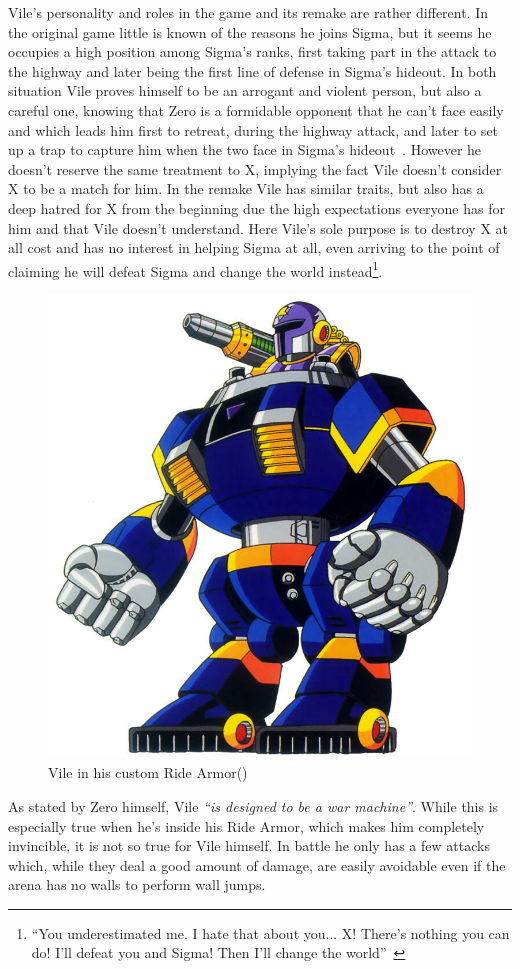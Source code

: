 Vile's personality and roles in the \x game and its remake are rather different. In the original game little is known of the reasons he joins Sigma, but it seems he occupies a high position among Sigma's ranks, first taking part in the attack to the highway and later being the first line of defense in Sigma's hideout. In both situation Vile proves himself to be an arrogant and violent person, but also a careful one, knowing that Zero is a formidable opponent that he can't face easily and which leads him first to retreat, during the highway attack, and later to set up a trap to capture him when the two face in Sigma's hideout~\cite{wiki:Vile}.  However he doesn't reserve the same treatment to X, implying the fact Vile doesn't consider X to be a match for him. In the remake Vile has similar traits, but also has a deep hatred for X from the beginning due the high expectations everyone has for him and that Vile doesn't understand. Here Vile's sole purpose is to destroy X at all cost and has no interest in helping Sigma at all, even arriving to the point of claiming he will defeat Sigma and change the world instead\footnote{\enquote{You underestimated me. I hate that about you... X! There's nothing you can do! I'll defeat you and Sigma! Then I'll change the world}~\cite{wiki:MMX_script}}.
\begin{figure}[htp]
	\centering
	\includegraphics[width=0.35\linewidth]{figures/X1/Sigma_stages/VileRideArmor.jpg}
	\caption{Vile in his custom Ride Armor(\cite{book:MMX_Complete_art})}
\end{figure}

As stated by Zero himself, Vile \emph{``is designed to be a war machine''}. While this is especially true when he's inside his Ride Armor, which makes him completely invincible, it is not so true for Vile himself. In battle he only has a few attacks which, while they deal a good amount of damage, are easily avoidable even if the arena has no walls to perform wall jumps.

